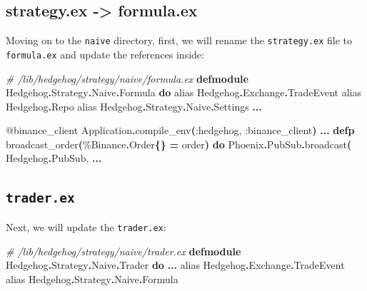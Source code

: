 \documentclass[
  oneside]{book}
\newenvironment{Shaded}{\begin{snugshade}}{\end{snugshade}}
\newcommand{\CommentTok}[1]{\textcolor[rgb]{0.56,0.35,0.01}{\textit{#1}}}
\newcommand{\ConstantTok}[1]{\textcolor[rgb]{0.56,0.35,0.01}{#1}}
\newcommand{\FunctionTok}[1]{\textcolor[rgb]{0.13,0.29,0.53}{\textbf{#1}}}
\newcommand{\ImportTok}[1]{#1}
\newcommand{\KeywordTok}[1]{\textcolor[rgb]{0.13,0.29,0.53}{\textbf{#1}}}
\newcommand{\NormalTok}[1]{#1}
\newcommand{\OperatorTok}[1]{\textcolor[rgb]{0.81,0.36,0.00}{\textbf{#1}}}
\newcommand{\OtherTok}[1]{\textcolor[rgb]{0.56,0.35,0.01}{#1}}
\newcommand{\VariableTok}[1]{\textcolor[rgb]{0.00,0.00,0.00}{#1}}
\begin{document}
\subsection{strategy.ex -\textgreater{} formula.ex}\label{strategy.ex---formula.ex}

Moving on to the \texttt{naive} directory, first, we will rename the \texttt{strategy.ex} file to \texttt{formula.ex} and update the references inside:

\begin{Shaded}
\begin{Highlighting}[]
\CommentTok{\# /lib/hedgehog/strategy/naive/formula.ex}
\KeywordTok{defmodule} \ConstantTok{Hedgehog}\OperatorTok{.}\ConstantTok{Strategy}\OperatorTok{.}\ConstantTok{Naive}\OperatorTok{.}\ConstantTok{Formula} \KeywordTok{do}
  \ImportTok{alias} \ConstantTok{Hedgehog}\OperatorTok{.}\ConstantTok{Exchange}\OperatorTok{.}\ConstantTok{TradeEvent}
  \ImportTok{alias} \ConstantTok{Hedgehog}\OperatorTok{.}\ConstantTok{Repo}
  \ImportTok{alias} \ConstantTok{Hedgehog}\OperatorTok{.}\ConstantTok{Strategy}\OperatorTok{.}\ConstantTok{Naive}\OperatorTok{.}\ConstantTok{Settings}
  \OperatorTok{...}

  \OtherTok{@binance\_client} \ConstantTok{Application}\OperatorTok{.}\NormalTok{compile\_env}\FunctionTok{(}\VariableTok{:hedgehog}\NormalTok{, }\VariableTok{:binance\_client}\FunctionTok{)}
  \OperatorTok{...}
  \KeywordTok{defp}\NormalTok{ broadcast\_order}\FunctionTok{(}\NormalTok{\%}\ConstantTok{Binance}\OperatorTok{.}\ConstantTok{Order}\FunctionTok{\{\}} \OperatorTok{=}\NormalTok{ order}\FunctionTok{)} \KeywordTok{do}
    \ConstantTok{Phoenix}\OperatorTok{.}\ConstantTok{PubSub}\OperatorTok{.}\NormalTok{broadcast}\FunctionTok{(}
      \ConstantTok{Hedgehog}\OperatorTok{.}\ConstantTok{PubSub}\NormalTok{,}
    \OperatorTok{...}
\end{Highlighting}
\end{Shaded}

\subsection{\texorpdfstring{\texttt{trader.ex}}{trader.ex}}\label{trader.ex}

Next, we will update the \texttt{trader.ex}:

\begin{Shaded}
\begin{Highlighting}[]
\CommentTok{\# /lib/hedgehog/strategy/naive/trader.ex}
\KeywordTok{defmodule} \ConstantTok{Hedgehog}\OperatorTok{.}\ConstantTok{Strategy}\OperatorTok{.}\ConstantTok{Naive}\OperatorTok{.}\ConstantTok{Trader} \KeywordTok{do}
  \OperatorTok{...}
  \ImportTok{alias} \ConstantTok{Hedgehog}\OperatorTok{.}\ConstantTok{Exchange}\OperatorTok{.}\ConstantTok{TradeEvent}
  \ImportTok{alias} \ConstantTok{Hedgehog}\OperatorTok{.}\ConstantTok{Strategy}\OperatorTok{.}\ConstantTok{Naive}\OperatorTok{.}\ConstantTok{Formula}
\end{Highlighting}
\end{Shaded}
\end{document}
